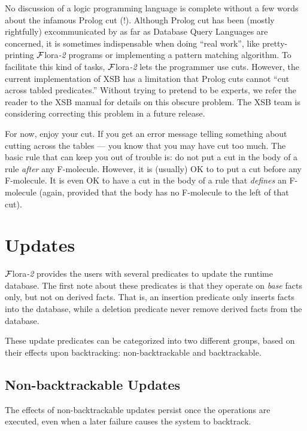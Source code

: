 \documentclass[11pt]{article}
\newcommand{\FLORA}{{\mbox{${\cal F}${\sc lora}\rm\emph{-2}}}\xspace}
\begin{document}
\index{cuts in \FLORA}
No discussion of a logic programming language is complete without a few
words about the infamous Prolog cut (!). Although Prolog cut has been
(mostly rightfully) excommunicated by as far as Database Query Languages
are concerned, it is sometimes indispensable when doing ``real work'', like
pretty-printing \FLORA programs or implementing a pattern matching
algorithm.  To facilitate this kind of tasks, \FLORA lets the programmer
use cuts.  However, the current implementation of XSB has a limitation that
Prolog cuts cannot ``cut across tabled predicates.''  Without trying to
pretend to be experts, we refer the reader to the XSB manual for details on
this obscure problem. The XSB team is considering correcting this problem
in a future release.

For now, enjoy your cut.  If you get an error message telling something
about cutting across the tables --- you know that you may have cut too much.
The basic rule that can keep you out of trouble is: do not put a cut
in the body of a rule \emph{after} any F-molecule. However, it is (usually)
OK to to put a cut before any F-molecule. It is even OK to have a cut in
the body of a rule that \emph{defines} an F-molecule (again, provided that
the body has no F-molecule to the left of that cut).


\section{Updates}


%
\FLORA provides the users with several predicates to update the runtime
database. The first note about these predicates is that they operate
on \emph{base} facts only, but not on derived facts. That is, an
insertion predicate only inserts facts into the database, while a
deletion predicate never remove derived facts from the database.

These update predicates can be categorized into two different groups,
based on their effects upon backtracking: non-backtrackable and
backtrackable.


\subsection{Non-backtrackable Updates} \label{sec:non-backtrackable-updates}


%
The effects of non-backtrackable updates persist once the operations are
executed, even when a later failure causes the system to backtrack.
\end{document}
